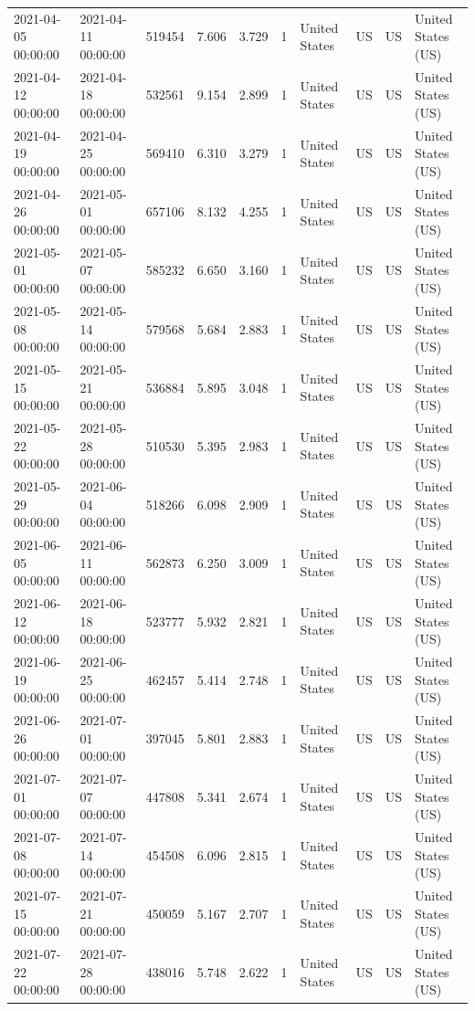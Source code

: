 \begin{tabular}{llrrrlllll}
2021-04-05 00:00:00 & 2021-04-11 00:00:00 & 519454 & 7.606 & 3.729 & 1 & United States & US & US & United States (US) \\
2021-04-12 00:00:00 & 2021-04-18 00:00:00 & 532561 & 9.154 & 2.899 & 1 & United States & US & US & United States (US) \\
2021-04-19 00:00:00 & 2021-04-25 00:00:00 & 569410 & 6.310 & 3.279 & 1 & United States & US & US & United States (US) \\
2021-04-26 00:00:00 & 2021-05-01 00:00:00 & 657106 & 8.132 & 4.255 & 1 & United States & US & US & United States (US) \\
2021-05-01 00:00:00 & 2021-05-07 00:00:00 & 585232 & 6.650 & 3.160 & 1 & United States & US & US & United States (US) \\
2021-05-08 00:00:00 & 2021-05-14 00:00:00 & 579568 & 5.684 & 2.883 & 1 & United States & US & US & United States (US) \\
2021-05-15 00:00:00 & 2021-05-21 00:00:00 & 536884 & 5.895 & 3.048 & 1 & United States & US & US & United States (US) \\
2021-05-22 00:00:00 & 2021-05-28 00:00:00 & 510530 & 5.395 & 2.983 & 1 & United States & US & US & United States (US) \\
2021-05-29 00:00:00 & 2021-06-04 00:00:00 & 518266 & 6.098 & 2.909 & 1 & United States & US & US & United States (US) \\
2021-06-05 00:00:00 & 2021-06-11 00:00:00 & 562873 & 6.250 & 3.009 & 1 & United States & US & US & United States (US) \\
2021-06-12 00:00:00 & 2021-06-18 00:00:00 & 523777 & 5.932 & 2.821 & 1 & United States & US & US & United States (US) \\
2021-06-19 00:00:00 & 2021-06-25 00:00:00 & 462457 & 5.414 & 2.748 & 1 & United States & US & US & United States (US) \\
2021-06-26 00:00:00 & 2021-07-01 00:00:00 & 397045 & 5.801 & 2.883 & 1 & United States & US & US & United States (US) \\
2021-07-01 00:00:00 & 2021-07-07 00:00:00 & 447808 & 5.341 & 2.674 & 1 & United States & US & US & United States (US) \\
2021-07-08 00:00:00 & 2021-07-14 00:00:00 & 454508 & 6.096 & 2.815 & 1 & United States & US & US & United States (US) \\
2021-07-15 00:00:00 & 2021-07-21 00:00:00 & 450059 & 5.167 & 2.707 & 1 & United States & US & US & United States (US) \\
2021-07-22 00:00:00 & 2021-07-28 00:00:00 & 438016 & 5.748 & 2.622 & 1 & United States & US & US & United States (US) \\

\end{tabular}
